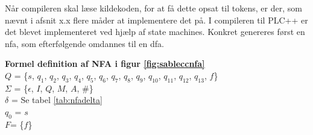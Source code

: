 


\noindent Når compileren skal læse kildekoden, for at få dette opsat til tokens, er der, som nævnt i afsnit x.x flere måder at implementere det på. I compileren til PLC++ er det blevet implementeret ved hjælp af state machines. Konkret genereres først en \gls{nfa}, som efterfølgende omdannes til en \gls{dfa}.


\noindent \textbf{Formel definition af NFA i figur \ref{fig:sableccnfa}}\\
\noindent $Q$ = \{$s$, $q_1$, $q_2$, $q_3$, $q_4$, $q_5$, $q_6$, $q_7$, $q_8$, $q_9$, $q_{10}$, $q_{11}$, $q_{12}$, $q_{13}$, $f$\}\\
\noindent $\Sigma$ = \{$\epsilon$, $I$, $Q$, $M$, $A$, $\#$\}\\
\noindent $\delta$ = Se tabel \ref{tab:nfadelta}\\
\noindent $q_0$ = $s$\\
\noindent $F$= \{$f$\}\\


